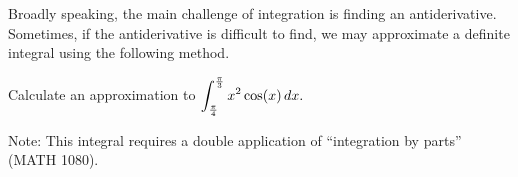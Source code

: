\documentclass[12pt]{article}
\begin{document}
Broadly speaking, the main challenge of integration is finding an antiderivative. Sometimes, if the antiderivative is difficult to find, we may approximate a definite integral using the following method.

\vspace{3mm}


\vspace{40mm}

\Example Calculate an approximation to $\displaystyle\int_{\frac{\pi}{4}}^{\frac{\pi}{3}}x^2\cos(x)\,dx.$

\vspace{110mm}

Note: This integral requires a double application of ``integration by parts'' (MATH 1080).
\end{document}

